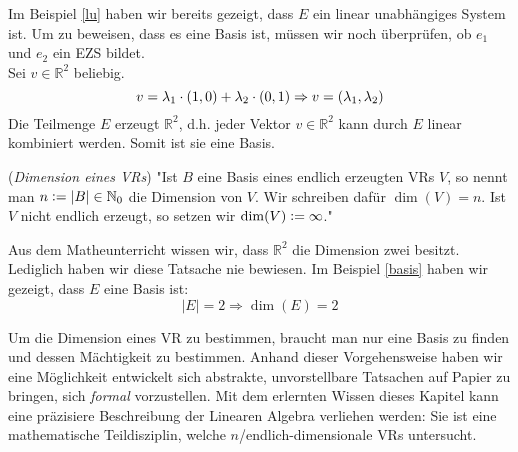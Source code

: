 \begin{example} \label{basis}
Im Beispiel \ref{lu} haben wir bereits gezeigt, dass $E$ ein linear unabhängiges System ist. Um zu beweisen, dass es eine Basis ist, müssen wir noch überprüfen, ob $e_1$ und $e_2$ ein \acl{EZS} bildet.
\\ Sei $v\in \mathbb{R}^2$ beliebig. 
\[v=\lambda_1\cdot(1,0)+\lambda_2\cdot (0,1)\\
\Rightarrow v=(\lambda_1,\lambda_2)\]
Die Teilmenge $E$ erzeugt $\mathbb{R}^2$, d.h. jeder Vektor $v \in \mathbb{R}^2$ kann durch $E$ linear kombiniert werden. Somit ist sie eine Basis.
\end{example}

\theoremstyle{definition}
\begin{definition}\cite[S. 504]{Enzy} (\emph{Dimension eines \acl{VR}s}) \label{def:dim}"Ist $B$ eine Basis eines endlich erzeugten \acl{VR}s $V$, so nennt man $n \vcentcolon= |B| \in \mathbb{N}_0$ die Dimension von $V$. Wir schreiben dafür $\dim(V)= n$. Ist $V$ nicht endlich erzeugt, so setzen wir $\dim(V)\vcentcolon= \infty$." 
\end{definition}

\begin{example}
Aus dem Matheunterricht wissen wir, dass $\mathbb{R}^2$ die Dimension zwei besitzt. Lediglich haben wir diese Tatsache nie bewiesen. Im Beispiel \ref{basis} haben wir gezeigt, dass $E$ eine Basis ist:
\[|E|=2\Rightarrow\dim(E)=2\]
\end{example}

Um die Dimension eines \acl{VR} zu bestimmen, braucht man nur eine Basis zu finden und dessen Mächtigkeit zu bestimmen. Anhand dieser Vorgehensweise haben wir eine Möglichkeit entwickelt sich abstrakte, unvorstellbare Tatsachen auf Papier zu bringen, sich \emph{formal} vorzustellen. Mit dem erlernten Wissen dieses Kapitel kann eine präzisiere Beschreibung der Linearen Algebra verliehen werden: Sie ist eine mathematische Teildisziplin, welche $n$/endlich-dimensionale \aclp{VR} untersucht. 